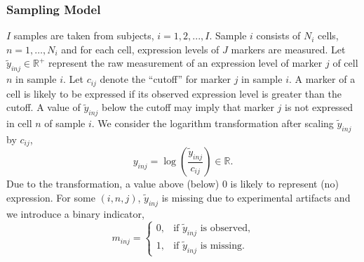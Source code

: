 \documentclass[12pt,]{article}
\providecommand{\tightlist}{%
  \setlength{\itemsep}{0pt}\setlength{\parskip}{0pt}}
\newcommand{\p}[1]{\left(#1\right)}
\begin{document}
\subsubsection{Sampling Model} 
$I$ samples are taken from subjects, \(i = 1,2,...,I\). Sample \(i\)
consists of \(N_i\) cells, \(n=1, \ldots, N_i\) and for each cell,
expression levels of \(J\) markers are measured. Let
\(\tilde{y}_{inj} \in \mathbb{R}^+\) represent the raw measurement of an
expression level of marker \(j\) of cell \(n\) in sample \(i\). Let
\(c_{ij}\) denote the ``cutoff'' for
 marker \(j\) in sample \(i\). A marker of a cell is likely to be expressed if its observed expression level is greater than the cutoff. A value of $\tilde{y}_{inj}$ below the cutoff may imply that marker $j$ is not expressed in cell $n$ of sample $i$.    We consider the logarithm transformation
after scaling \(\tilde{y}_{inj}\) by \(c_{ij}\), \[
y_{inj}=\log\p{\frac{\tilde{y}_{inj}}{c_{ij}}} \in \mathbb{R}.
\]
Due to the transformation, a value above (below) 0 is likely to represent (no) expression. For some \((i, n, j)\), \(\tilde{y}_{inj}\) is missing due to experimental artifacts and we
introduce a binary indicator, \[
m_{inj} = \begin{cases}
  0, & \text{if $\tilde{y}_{inj}$ is observed,} \\
  1, & \text{if $\tilde{y}_{inj}$ is missing.}
\end{cases}
\] %

\def\labelenumi{\arabic{enumi}.}

\end{document}
